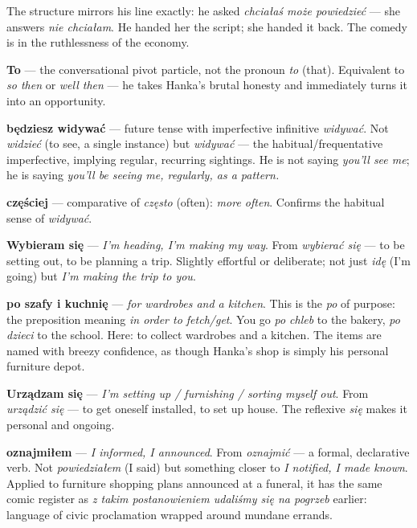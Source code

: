 The structure mirrors his line exactly: he asked \textit{chciałaś może
powiedzieć} --- she answers \textit{nie chciałam}. He handed her the
script; she handed it back. The comedy is in the ruthlessness of the
economy.



\textbf{To} --- the conversational pivot particle, not the pronoun
\textit{to} (that). Equivalent to \textit{so then} or \textit{well
then} --- he takes Hanka's brutal honesty and immediately turns it into
an opportunity.

\textbf{będziesz widywać} --- future tense with imperfective infinitive
\textit{widywać}. Not \textit{widzieć} (to see, a single instance) but
\textit{widywać} --- the habitual/frequentative imperfective, implying
regular, recurring sightings. He is not saying \textit{you'll see me};
he is saying \textit{you'll be seeing me, regularly, as a pattern.}

\textbf{częściej} --- comparative of \textit{często} (often):
\textit{more often}. Confirms the habitual sense of \textit{widywać}.

\textbf{Wybieram się} --- \textit{I'm heading, I'm making my way}. From
\textit{wybierać się} --- to be setting out, to be planning a trip.
Slightly effortful or deliberate; not just \textit{idę} (I'm going) but
\textit{I'm making the trip to you}.

\textbf{po szafy i kuchnię} --- \textit{for wardrobes and a kitchen}.
This is the \textit{po} of purpose: the preposition meaning \textit{in
order to fetch/get}. You go \textit{po chleb} to the bakery,
\textit{po dzieci} to the school. Here: to collect wardrobes and a
kitchen. The items are named with breezy confidence, as though Hanka's
shop is simply his personal furniture depot.

\textbf{Urządzam się} --- \textit{I'm setting up / furnishing / sorting
myself out}. From \textit{urządzić się} --- to get oneself installed,
to set up house. The reflexive \textit{się} makes it personal and
ongoing.

\textbf{oznajmiłem} --- \textit{I informed, I announced}. From
\textit{oznajmić} --- a formal, declarative verb. Not
\textit{powiedziałem} (I said) but something closer to \textit{I
notified, I made known}. Applied to furniture shopping plans announced
at a funeral, it has the same comic register as \textit{z takim
postanowieniem udaliśmy się na pogrzeb} earlier: language of civic
proclamation wrapped around mundane errands.

